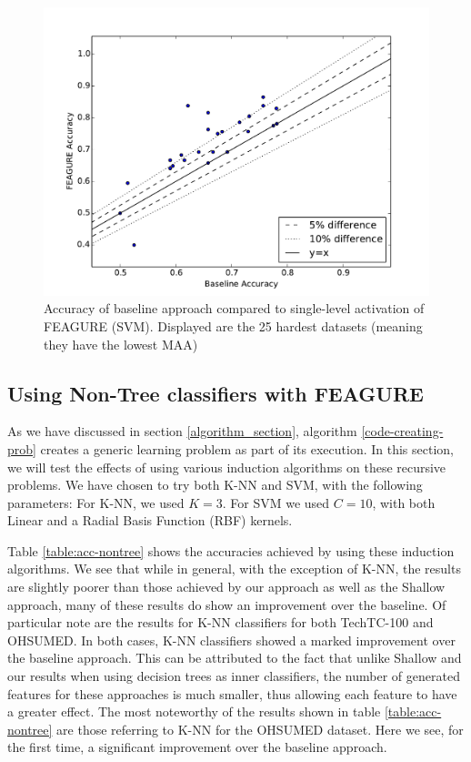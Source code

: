 \documentclass[twoside,11pt]{article}
\theoremstyle{definition}
\begin{document}
\begin{figure}
	\centering
	\includegraphics[width=0.8\linewidth]{25best}
	\caption{Accuracy of
		baseline approach compared to single-level activation of FEAGURE (SVM). Displayed are the 25 hardest datasets (meaning they have the lowest MAA)}
	\label{fig:25best}
\end{figure}

\subsection{Using Non-Tree classifiers with FEAGURE}

As we have discussed in section \ref{algorithm_section}, algorithm \ref{code-creating-prob} creates a generic learning problem as part of its execution. In this section, we will test the effects of using various induction algorithms on these recursive problems. We have chosen to try both K-NN and SVM, with the following parameters: For K-NN, we used $K=3$. For SVM we used $C=10$, with both Linear and a Radial Basis Function (RBF) kernels.

Table \ref{table:acc-nontree} shows the accuracies achieved by using these induction algorithms. We see that while in general, with the exception of K-NN, the results are slightly poorer than those achieved by our approach as well as the Shallow approach, many of these results do show an improvement over the baseline.
Of particular note are the results for K-NN classifiers for both TechTC-100 and OHSUMED. In both cases, K-NN classifiers showed a marked improvement over the baseline approach. This can be attributed to the fact that unlike Shallow and our results when using decision trees as inner classifiers, the number of generated features for these approaches is much smaller, thus allowing each feature to have a greater effect.
The most noteworthy of the results shown in table \ref{table:acc-nontree} are those referring to K-NN for the OHSUMED dataset. Here we see, for the first time, a significant improvement over the baseline approach.
\end{document}
